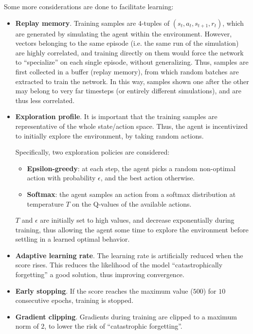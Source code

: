 \documentclass[11pt,a4paper]{scrartcl}
\newcommand{\q}[1]{``#1''}
\begin{document}
Some more considerations are done to facilitate learning:
\begin{itemize}
    \item \textbf{Replay memory}. Training samples are $4$-tuples of $(s_t, a_t, s_{t+1}, r_t)$, which are generated by simulating the agent within the environment. However, vectors belonging to the same episode (i.e. the same run of the simulation) are highly correlated, and training directly on them would force the network to \q{specialize} on each single episode, without generalizing. Thus, samples are first collected in a buffer (replay memory), from which random batches are extracted to train the network. In this way, samples shown one after the other may belong to very far timesteps (or entirely different simulations), and are thus less correlated.
    \item \textbf{Exploration profile}. It is important that the training samples are representative of the whole state/action space. Thus, the agent is incentivized to initially explore the environment, by taking random actions.
    
    Specifically, two exploration policies are considered:
    \begin{itemize}
        \item \textbf{Epsilon-greedy}: at each step, the agent picks a random non-optimal action with probability $\epsilon$, and the best action otherwise.
        \item \textbf{Softmax}: the agent samples an action from a softmax distribution at temperature $T$ on the Q-values of the available actions.
    \end{itemize} 
    $T$ and $\epsilon$ are initially set to high values, and decrease exponentially during training, thus allowing the agent some time to explore the environment before settling in a learned optimal behavior. 
    \item \textbf{Adaptive learning rate}. The learning rate is artificially reduced when the score rises. This reduces the likelihood of the model \q{catastrophically forgetting} a good solution, thus improving convergence.
    \item \textbf{Early stopping}. If the score reaches the maximum value ($500$) for $10$ consecutive epochs, training is stopped.
    \item \textbf{Gradient clipping}. Gradients during training are clipped to a maximum norm of $2$, to lower the risk of \q{catastrophic forgetting}.
\end{itemize}
\end{document}
